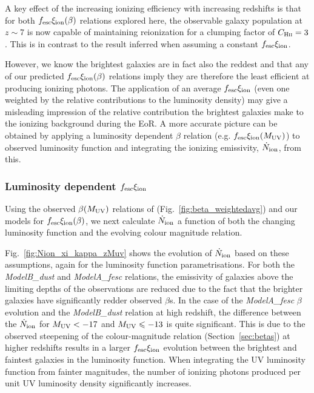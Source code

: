 A key effect of the increasing ionizing efficiency with increasing redshifts is that for both $f_{\rm{esc}}\xi_{\rm{ion}}(\beta)$ relations explored here, the observable galaxy population at $z\sim7$ is now capable of maintaining reionization for a clumping factor of $C_{\textsc{Hii}} = 3$. This is in contrast to the result inferred when assuming a constant $f_{\rm{esc}}\xi_{\rm{ion}}$.  

However, we know the brightest galaxies are in fact also the reddest and that any of our predicted $f_{\rm{esc}}\xi_{\rm{ion}}(\beta)$ relations imply they are therefore the least efficient at producing ionizing photons. The application of an average $f_{\rm{esc}}\xi_{\rm{ion}}$ (even one weighted by the relative contributions to the luminosity density) may give a misleading impression of the relative contribution the brightest galaxies make to the ionizing background during the EoR. A more accurate picture can be obtained by applying a luminosity dependent $\beta$ relation (e.g. $f_{\rm{esc}}\xi_{\rm{ion}}(M_{\rm{UV}})$) to observed luminosity function and integrating the ionizing emissivity, $\dot{N}_{\rm{ion}}$, from this.

\subsubsection{Luminosity dependent $f_{\rm{esc}}\xi_{\rm{ion}}$}
Using the observed $\beta(M_{\rm{UV}})$ relations of \citet{Bouwens:2013vf} (Fig.~\ref{fig:beta_weightedavg}) and our models for $f_{\rm{esc}}\xi_{\rm{ion}}(\beta)$, we next calculate $\dot{N}_{\rm{ion}}$ a function of both the changing luminosity function and the evolving colour magnitude relation. 

Fig.~\ref{fig:Nion_xi_kappa_zMuv} shows the evolution of $\dot{N}_{\rm{ion}}$ based on these assumptions, again for the \citet{Bouwens:2014tx} luminosity function parametrisations. For both the \emph{ModelB\_dust} and \emph{ModelA\_fesc} relations, the emissivity of galaxies above the limiting depths of the observations are reduced due to the fact that the brighter galaxies have significantly redder observed $\beta$s. In the case of the \emph{ModelA\_fesc} $\beta$ evolution and the \emph{ModelB\_dust} relation at high redshift, the difference between the $\dot{N}_{\rm{ion}}$ for $M_{\rm{UV}} < -17$ and $M_{\rm{UV}} \leq -13$ is quite significant. This is due to the observed steepening of the colour-magnitude relation (Section~\ref{sec:betas}) at higher redshifts results in a larger $f_{\rm{esc}}\xi_{\rm{ion}}$ evolution between the brightest and faintest galaxies in the luminosity function. When integrating the UV luminosity function from fainter magnitudes, the number of ionizing photons produced per unit UV luminosity density significantly increases.

